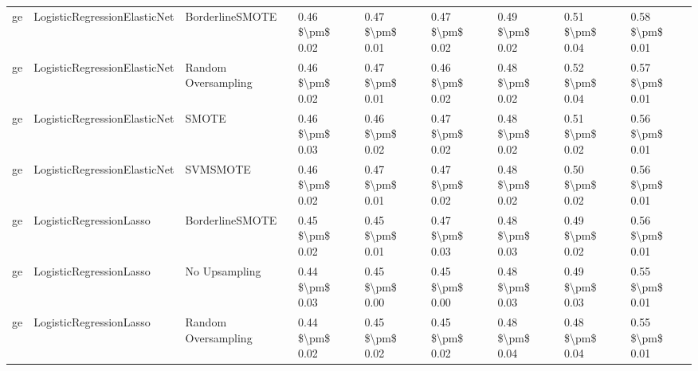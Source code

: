 \begin{tabular}{lllllllll}
      ge &    LogisticRegressionElasticNet &               BorderlineSMOTE & 0.46 \$\textbackslash pm\$ 0.02 &           0.47 \$\textbackslash pm\$ 0.01 &       0.47 \$\textbackslash pm\$ 0.02 &        0.49 \$\textbackslash pm\$ 0.02 &                         0.51 \$\textbackslash pm\$ 0.04 &     0.58 \$\textbackslash pm\$ 0.01 \\
      ge &    LogisticRegressionElasticNet &           Random Oversampling & 0.46 \$\textbackslash pm\$ 0.02 &           0.47 \$\textbackslash pm\$ 0.01 &       0.46 \$\textbackslash pm\$ 0.02 &        0.48 \$\textbackslash pm\$ 0.02 &                         0.52 \$\textbackslash pm\$ 0.04 &     0.57 \$\textbackslash pm\$ 0.01 \\
      ge &    LogisticRegressionElasticNet &                         SMOTE & 0.46 \$\textbackslash pm\$ 0.03 &           0.46 \$\textbackslash pm\$ 0.02 &       0.47 \$\textbackslash pm\$ 0.02 &        0.48 \$\textbackslash pm\$ 0.02 &                         0.51 \$\textbackslash pm\$ 0.02 &     0.56 \$\textbackslash pm\$ 0.01 \\
      ge &    LogisticRegressionElasticNet &                      SVMSMOTE & 0.46 \$\textbackslash pm\$ 0.02 &           0.47 \$\textbackslash pm\$ 0.01 &       0.47 \$\textbackslash pm\$ 0.02 &        0.48 \$\textbackslash pm\$ 0.02 &                         0.50 \$\textbackslash pm\$ 0.02 &     0.56 \$\textbackslash pm\$ 0.01 \\
      ge &         LogisticRegressionLasso &               BorderlineSMOTE & 0.45 \$\textbackslash pm\$ 0.02 &           0.45 \$\textbackslash pm\$ 0.01 &       0.47 \$\textbackslash pm\$ 0.03 &        0.48 \$\textbackslash pm\$ 0.03 &                         0.49 \$\textbackslash pm\$ 0.02 &     0.56 \$\textbackslash pm\$ 0.01 \\
      ge &         LogisticRegressionLasso &                 No Upsampling & 0.44 \$\textbackslash pm\$ 0.03 &           0.45 \$\textbackslash pm\$ 0.00 &       0.45 \$\textbackslash pm\$ 0.00 &        0.48 \$\textbackslash pm\$ 0.03 &                         0.49 \$\textbackslash pm\$ 0.03 &     0.55 \$\textbackslash pm\$ 0.01 \\
      ge &         LogisticRegressionLasso &           Random Oversampling & 0.44 \$\textbackslash pm\$ 0.02 &           0.45 \$\textbackslash pm\$ 0.02 &       0.45 \$\textbackslash pm\$ 0.02 &        0.48 \$\textbackslash pm\$ 0.04 &                         0.48 \$\textbackslash pm\$ 0.04 &     0.55 \$\textbackslash pm\$ 0.01 \\

\end{tabular}

